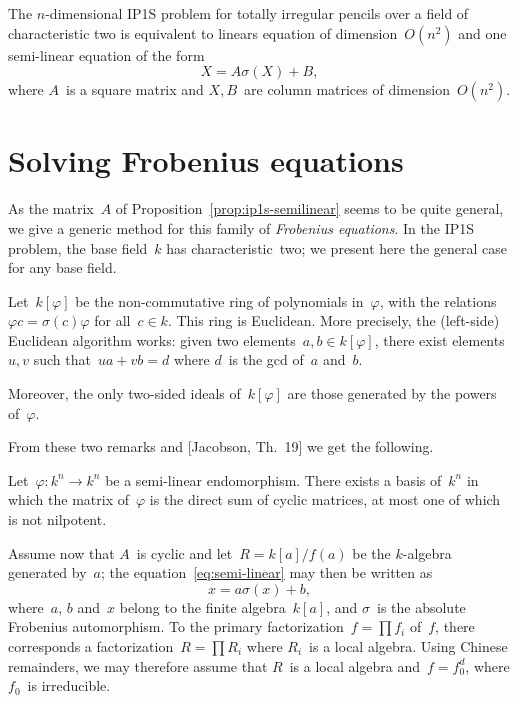 \documentclass{article}
\begin{document}
\begin{prop}\label{prop:ip1s-semilinear}
The $n$-dimensional IP1S problem for totally irregular pencils over a
field of characteristic two is equivalent to linears equation of
dimension~$O(n^2)$ and one semi-linear equation of
the form
\begin{equation*}
X = A σ(X) + B,
\end{equation*}
where $A$~is a square matrix and $X, B$~are column matrices of
dimension~$O(n^2)$.
\end{prop}

\section{Solving Frobenius equations}

As the matrix~$A$ of Proposition~\ref{prop:ip1s-semilinear} seems to be
quite general, we give a generic method for this family of
\emph{Frobenius equations}. In the IP1S problem, the base field~$k$ has
characteristic~two; we present here the general case for any base field.

Let~$k[φ]$ be the non-commutative ring of polynomials in~$φ$, with the
relations~$φ c = σ(c) φ$ for all~$c ∈ k$. This ring is Euclidean.
More precisely, the (left-side) Euclidean algorithm works: given two
elements~$a, b ∈ k[φ]$, there exist elements~$u, v$ such that~$u a + v b =
d$ where $d$~is the gcd of~$a$ and~$b$.

Moreover, the only two-sided ideals of~$k[φ]$ are those generated by the
powers of~$φ$.

From these two remarks and [Jacobson, Th.~19] we get the following.
\begin{thm}
Let~$φ: k^n → k^n$ be a semi-linear endomorphism. There exists a basis
of~$k^n$ in which the matrix of~$φ$ is the direct sum of cyclic matrices,
at most one of which is not nilpotent.
\end{thm}

Assume now that $A$~is cyclic and let~$R = k[a]/f(a)$ be the $k$-algebra
generated by~$a$; the equation~\eqref{eq:semi-linear} may then be written
as
\begin{equation}\label{eq:semi-linear-pol}
x = a σ(x) + b,
\end{equation}
where~$a$, $b$ and~$x$ belong to the finite algebra~$k[a]$, and $σ$~is
the absolute Frobenius automorphism. To the primary factorization~$f = ∏
f_i$ of~$f$, there corresponds a factorization~$R = ∏ R_i$ where $R_i$~is
a local algebra. Using Chinese remainders, we may therefore assume that
$R$~is a local algebra and~$f = f_0^d$, where $f_0$~is irreducible.
\end{document}
